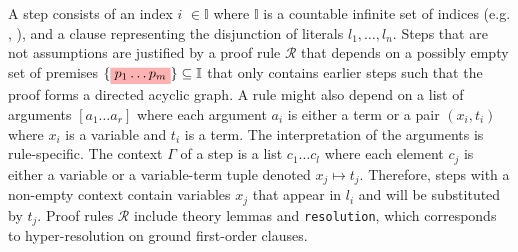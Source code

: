 \bigskip

A step %
consists of an index \colorbox{indexClr!30}{$i$} $\in \mathbb{I}$ where $\mathbb{I}$ is a countable infinite set of indices (e.g. , ), and a clause representing the disjunction of literals \colorbox{green!30}{$l_1, \dots, l_n$}.
Steps that are not assumptions are justified by a proof rule \colorbox{purple!30}{$\mathcal{R}$} that depends on a possibly empty set of premises $\{\colorbox{red!30}{$p_1 \dots  p_m$}\} \subseteq \mathbb{I}$ that only contains earlier steps such that the proof forms
a directed acyclic graph. A rule might also depend on a list of arguments \colorbox{orange!30}{$[a_1 \dots a_r]$} where each argument $a_i$ is either a term or a pair $(x_i, t_i)$ where $x_i$ is a variable and $t_i$ is a term.
The interpretation of the arguments is rule-specific. The context \colorbox{blue!30}{$\Gamma$} of a step is a list $c_1 \dots c_l $ where each element $c_j$ is either a variable or a variable-term tuple denoted $x_j \mapsto t_j$.
Therefore, steps with a non-empty context contain variables $x_j$ that appear in \colorbox{green!30}{$l_i$} and will be substituted by $t_j$. Proof rules \colorbox{purple!30}{$\mathcal{R}$} include theory lemmas and \texttt{resolution}, which corresponds to hyper-resolution on ground first-order clauses.

